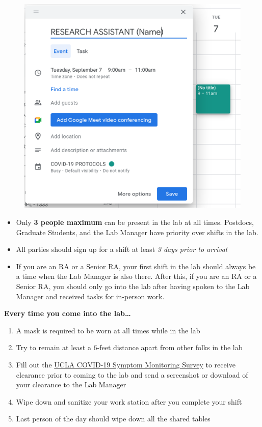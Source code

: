 \documentclass[
]{book}
\begin{document}
\begin{figure}
\centering
\includegraphics{images/lab_protocols/covid_protocols/3.png}
\caption{}
\end{figure}

\begin{itemize}
\item
  Only \textbf{3 people maximum} can be present in the lab at all times. Postdocs, Graduate Students, and the Lab Manager have priority over shifts in the lab.
\item
  All parties should sign up for a shift at least \emph{3 days prior to arrival}
\item
  If you are an RA or a Senior RA, your first shift in the lab should always be a time when the Lab Manager is also there. After this, if you are an RA or a Senior RA, you should only go into the lab after having spoken to the Lab Manager and received tasks for in-person work.
\end{itemize}

\textbf{Every time you come into the lab\ldots{}}

\begin{enumerate}
\def\labelenumi{\arabic{enumi}.}
\item
  A mask is required to be worn at all times while in the lab
\item
  Try to remain at least a 6-feet distance apart from other folks in the lab
\item
  Fill out the \href{https://www.adminvc.ucla.edu/covid-19/ucla-employee-faq/symptom-monitoring}{UCLA COVID-19 Symptom Monitoring Survey} to receive clearance prior to coming to the lab and send a screenshot or download of your clearance to the Lab Manager
\item
  Wipe down and sanitize your work station after you complete your shift
\item
  Last person of the day should wipe down all the shared tables
\end{enumerate}
\end{document}
